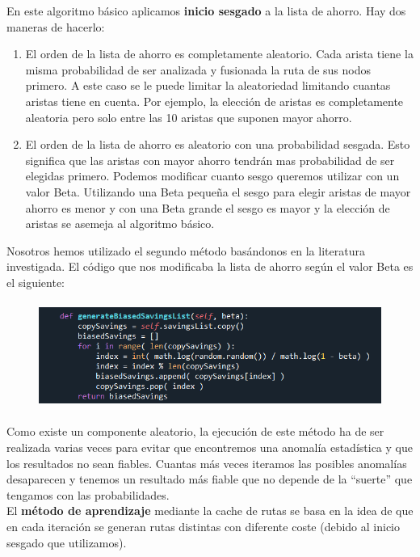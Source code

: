 \documentclass[11pt]{article} %
\begin{document}
\begin{enumerate}
En este algoritmo básico aplicamos \textbf{inicio sesgado} a la lista de ahorro. Hay dos maneras de hacerlo:
\begin{enumerate}
\item El orden de la lista de ahorro es completamente aleatorio. Cada arista tiene la misma probabilidad de ser analizada y fusionada la ruta de sus nodos primero.
A este caso se le puede limitar la aleatoriedad limitando cuantas aristas tiene en cuenta. Por ejemplo, la elección de aristas es completamente aleatoria pero solo entre las 10 aristas que suponen mayor ahorro.
\item El orden de la lista de ahorro es aleatorio con una probabilidad sesgada. Esto significa que las aristas con mayor ahorro tendrán mas probabilidad de ser elegidas primero.
Podemos modificar cuanto sesgo queremos utilizar con un valor Beta. Utilizando una Beta pequeña el sesgo para elegir aristas de mayor ahorro es menor y con una Beta grande el sesgo es mayor y la elección de aristas se asemeja al algoritmo básico.
\end{enumerate}
Nosotros hemos utilizado el segundo método basándonos en la literatura investigada. El código que nos modificaba la lista de ahorro según el valor Beta es el siguiente:

\begin{figure}[h]
\centering
\includegraphics[width=0.8\linewidth, height=3.5cm]{generateBiasedSavingList.png} 
\label{fig:subim1}
\end{figure}

Como existe un componente aleatorio, la ejecución de este método ha de ser realizada varias veces para evitar que encontremos una anomalía estadística y que los resultados no sean fiables. Cuantas más veces iteramos las posibles anomalías desaparecen y tenemos un resultado más fiable que no depende de la “suerte” que tengamos con las probabilidades. \\

El \textbf{método de aprendizaje} mediante la cache de rutas se basa en la idea de que en cada iteración se generan rutas distintas con diferente coste (debido al inicio sesgado que utilizamos). \\


\end{enumerate}
\end{document}
